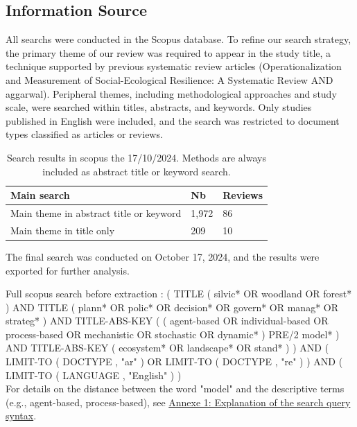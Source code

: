 \documentclass[a4paper,12pt]{article}
\begin{document}
\subsection{Information Source}
\label{sec:information_source}

All searchs were conducted in the Scopus database. To refine our search strategy, the primary theme of our review was required to appear in the study title, a technique supported by previous systematic review articles (Operationalization and Measurement of Social-Ecological Resilience: A Systematic Review AND aggarwal). Peripheral themes, including methodological approaches and study scale, were searched within titles, abstracts, and keywords. Only studies published in English were included, and the search was restricted to document types classified as articles or reviews. \\

\begin{table}[h!]
    \centering
    \begin{tabular}{| m{8cm}  m{2cm}  m{2cm} |}
    \hline
    Main search & Nb & Reviews \\ 
    \hline
    Main theme in abstract title or keyword & 1,972 & 86 \\ 
    Main theme in title only & 209 & 10 \\
    \hline
    \end{tabular}
    \caption{Search results in scopus the 17/10/2024. Methods are always included as abstract title or keyword search.}
    \label{tab:information_sources}
\end{table}

The final search was conducted on October 17, 2024, and the results were exported for further analysis.

Full scopus search before extraction : ( TITLE ( silvic* OR woodland OR forest* ) AND TITLE ( plann* OR polic* OR decision* OR govern* OR manag* OR strateg* ) AND TITLE-ABS-KEY ( ( agent-based OR individual-based OR process-based OR mechanistic OR stochastic OR dynamic* ) PRE/2 model* ) AND TITLE-ABS-KEY ( ecosystem* OR landscape* OR stand* ) ) AND ( LIMIT-TO ( DOCTYPE , "ar" ) OR LIMIT-TO ( DOCTYPE , "re" ) ) AND ( LIMIT-TO ( LANGUAGE , "English" ) ) \\

For details on the distance between the word "model" and the descriptive terms (e.g., agent-based, process-based), see \hyperref[sec:annexe-1]{Annexe 1: Explanation of the search query syntax}.
\end{document}
